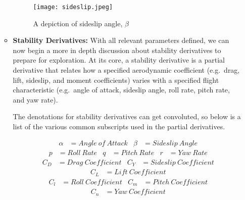 \documentclass{article}
\begin{document}
\begin{itemize}
\begin{itemize}
\begin{minipage}{\linewidth}
                    \centering
                    \begin{figure}[H]
                        \centering
                        \texttt{[image: sideslip.jpeg]}
                        \captionsetup{width=0.995\linewidth, justification=raggedright}
                        \caption{A depiction of sideslip angle, $\beta$}\label{fig:sideslip}
                    \end{figure}
                \end{minipage}
            \vspace{12pt}   
            
            \item[] \textbf{Stability Derivatives:} With all relevant parameters defined, we can now begin a more in depth discussion about stability derivatives to prepare for exploration.
            At its core, a stability derivative is a partial derivative that relates how a specified aerodynamic coefficient (e.g.\ drag, lift, sideslip, and moment coefficients) varies with a specified flight characteristic (e.g.\ angle of attack, sideslip angle, roll rate, pitch rate, and yaw rate).

            The denotations for stability derivatives can get convoluted, so below is a list of the various common subscripts used in the partial derivatives.

            \begin{align*}
            \alpha &= Angle~of~Attack &
            \beta &= Sideslip~Angle
            \end{align*}
            \begin{align*}
            p &= Roll~Rate &
            q &= Pitch~Rate &
            r &= Yaw~Rate
            \end{align*}
            \begin{align*}
            C_D &= Drag~Coefficient &
            C_Y &= Sideslip~Coefficient
            \end{align*}
            \begin{align*}
            C_L &= Lift~Coefficient
            \end{align*}
            \begin{align*}
            C_l &= Roll~Coefficient &
            C_m &= Pitch~Coefficient
            \end{align*}
            \begin{align*}
            C_n &= Yaw~Coefficient
            \end{align*}


\end{itemize}
\end{itemize}
\end{document}
